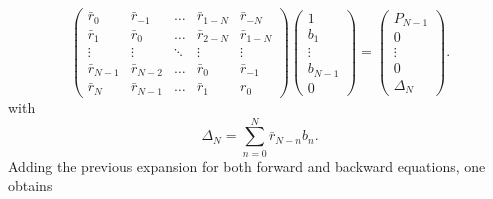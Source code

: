 \documentclass[twocolumn,showpacs,preprintnumbers,nofootinbib,prd,
superscriptaddress,10pt]{revtex4-1}
\begin{document}
\begin{equation}\label{eq:OrderN}
    \begin{pmatrix}
    \bar r_0 & \bar r_{-1} & \dots &\bar r_{1 - N} & \bar r_{- N}\\
    \bar r_{1} & \bar r_0 & \dots & \bar r_{2 - N} & \bar r_{1 - N}\\ 
    \vdots & \vdots & \ddots & \vdots & \vdots \\ 
    \bar r_{N -1} & \bar r_{N-2} & \dots & \bar r_0 & \bar r_{-1}
    \\
    \bar r_{N } & \bar r_{N -1} & \dots & \bar r_1 & r_0 
    \end{pmatrix} 
    \begin{pmatrix}
    1  \\   b_1  \\  \vdots \\   b_{N - 1} \\ 0 
    \end{pmatrix} =
    \begin{pmatrix}
    P_{N -1} \\  0 \\ \vdots \\ 0 \\ \Delta_N
    \end{pmatrix} .
\end{equation}
with 
\begin{equation}
    \Delta_N = \sum_{n=0}^N \bar r_{N - n}b_n.
\end{equation}
Adding the previous expansion for both forward and backward equations, one obtains 
\end{document}
